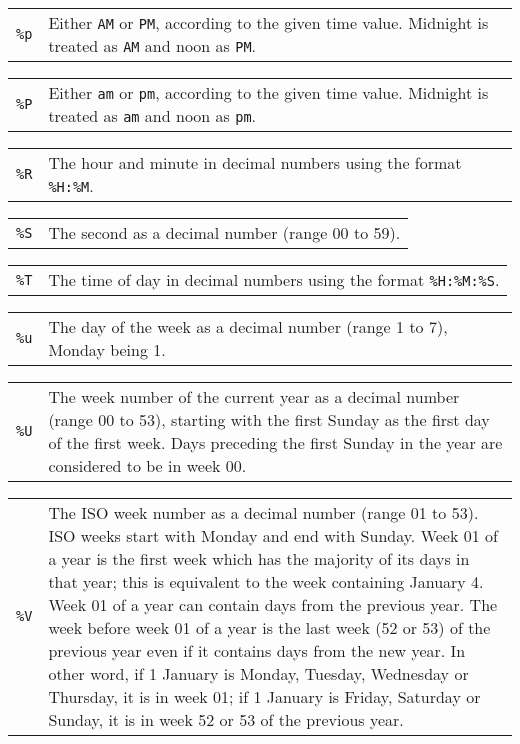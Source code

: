 \documentclass[11pt]{report}
\begin{document}
\begin{tabular}{@{}p{20pt}p{421.5pt}@{}}
{\tt\%p}&Either {\tt AM} or {\tt PM}, according to the given time value.
Midnight is treated as {\tt AM} and noon as {\tt PM}.\\
\end{tabular}

\begin{tabular}{@{}p{20pt}p{421.5pt}@{}}
{\tt\%P}&Either {\tt am} or {\tt pm}, according to the given time value.
Midnight is treated as {\tt am} and noon as {\tt pm}.\\
\end{tabular}

\begin{tabular}{@{}p{20pt}p{421.5pt}@{}}
{\tt\%R}&The hour and minute in decimal numbers using the format
\verb|%H:%M|.\\
\end{tabular}

\begin{tabular}{@{}p{20pt}p{421.5pt}@{}}
{\tt\%S}&The second as a decimal number (range 00 to 59).\\
\end{tabular}

\begin{tabular}{@{}p{20pt}p{421.5pt}@{}}
{\tt\%T}&The time of day in decimal numbers using the format
\verb|%H:%M:%S|.\\
\end{tabular}

\begin{tabular}{@{}p{20pt}p{421.5pt}@{}}
{\tt\%u}&The day of the week as a decimal number (range 1 to 7), Monday
being 1.\\
\end{tabular}

\begin{tabular}{@{}p{20pt}p{421.5pt}@{}}
{\tt\%U}&The week number of the current year as a decimal number (range
00 to 53), starting with the first Sunday as the first day of the first
week. Days preceding the first Sunday in the year are considered to be
in week 00.
\end{tabular}

\begin{tabular}{@{}p{20pt}p{421.5pt}@{}}
{\tt\%V}&The ISO week number as a decimal number (range 01 to 53). ISO
weeks start with Monday and end with Sunday. Week 01 of a year is the
first week which has the majority of its days in that year; this is
equivalent to the week containing January 4. Week 01 of a year can
contain days from the previous year. The week before week 01 of a year
is the last week (52 or 53) of the previous year even if it contains
days from the new year. In other word, if 1 January is Monday, Tuesday,
Wednesday or Thursday, it is in week 01; if 1 January is Friday,
Saturday or Sunday, it is in week 52 or 53 of the previous year.\\
\end{tabular}
\end{document}
